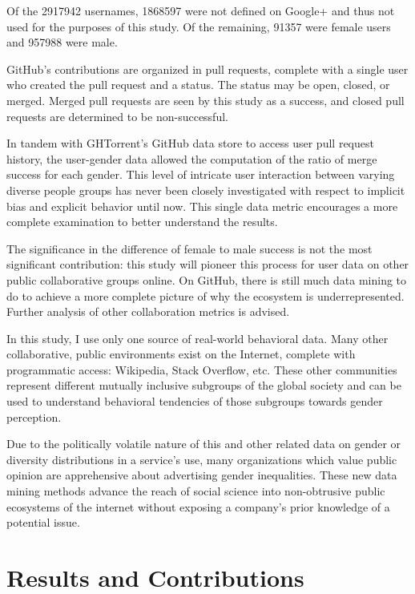 \documentclass{sigplanconf}
\begin{document}
Of the \num{2917942} usernames, \num{1868597} were not defined on Google+ and thus
not used for the purposes of this study. Of the remaining, \num{91357} were
female users and \num{957988} were male.

GitHub's contributions are organized in pull requests, complete with a single
user who created the pull request and a status. The status may be open, closed,
or merged. Merged pull requests are seen by this study as a success, and closed pull
requests are determined to be non-successful.

In tandem with GHTorrent's GitHub data store to
access user pull request history, the user-gender data allowed the computation of
the ratio of merge success for each gender. This level of intricate user interaction
between varying diverse people groups has never been closely investigated with
respect to implicit bias and explicit behavior until
now. This single data metric encourages a more complete examination to better
understand the results.

The significance in the difference of female to male success is not the most
significant contribution: this study will pioneer this process for user data on
other public collaborative groups online.
On GitHub, there is still much data mining to do to achieve a more complete
picture of why the ecosystem is underrepresented. Further analysis of other
collaboration metrics is advised.

In this study, I use only one source of real-world behavioral data.
Many other collaborative, public environments exist on the Internet, complete
with programmatic access: Wikipedia, Stack Overflow, etc. These other
communities represent different mutually inclusive subgroups of the global
society and can be used to understand behavioral tendencies of those subgroups
towards gender perception.

Due to the politically volatile nature of this and other related data on gender
or diversity distributions in a service's use, many organizations which value
public opinion are apprehensive about advertising gender inequalities. These new data
mining methods advance the reach of social science into non-obtrusive public
ecosystems of the internet without exposing a company's prior knowledge of a
potential issue.

\section{Results and Contributions}
\end{document}
